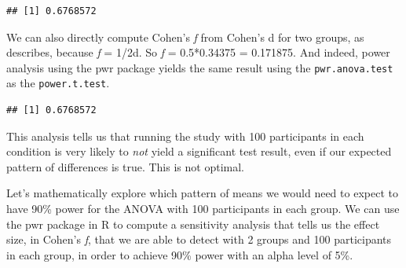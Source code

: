 \documentclass[
]{book}
\newenvironment{Shaded}{\begin{snugshade}}{\end{snugshade}}
\newcommand{\AttributeTok}[1]{\textcolor[rgb]{0.77,0.63,0.00}{#1}}
\newcommand{\CommentTok}[1]{\textcolor[rgb]{0.56,0.35,0.01}{\textit{#1}}}
\newcommand{\DecValTok}[1]{\textcolor[rgb]{0.00,0.00,0.81}{#1}}
\newcommand{\FloatTok}[1]{\textcolor[rgb]{0.00,0.00,0.81}{#1}}
\newcommand{\FunctionTok}[1]{\textcolor[rgb]{0.00,0.00,0.00}{#1}}
\newcommand{\NormalTok}[1]{#1}
\newcommand{\OtherTok}[1]{\textcolor[rgb]{0.56,0.35,0.01}{#1}}
\newcommand{\SpecialCharTok}[1]{\textcolor[rgb]{0.00,0.00,0.00}{#1}}
\begin{document}
\begin{verbatim}
## [1] 0.6768572
\end{verbatim}

We can also directly compute Cohen's \emph{f} from Cohen's d for two groups, as \citet{cohen1988spa} describes, because \emph{f} = 1/2d. So \emph{f} = 0.5*0.34375 = 0.171875. And indeed, power analysis using the pwr package yields the same result using the \texttt{pwr.anova.test} as the \texttt{power.t.test}.

\begin{Shaded}
\end{Shaded}

\begin{verbatim}
## [1] 0.6768572
\end{verbatim}

This analysis tells us that running the study with 100 participants in each condition is very likely to \emph{not} yield a significant test result, even if our expected pattern of differences is true. This is not optimal.

Let's mathematically explore which pattern of means we would need to expect to have 90\% power for the ANOVA with 100 participants in each group. We can use the pwr package in R to compute a sensitivity analysis that tells us the effect size, in Cohen's \emph{f}, that we are able to detect with 2 groups and 100 participants in each group, in order to achieve 90\% power with an alpha level of 5\%.

\begin{Shaded}
\end{Shaded}
\end{document}
